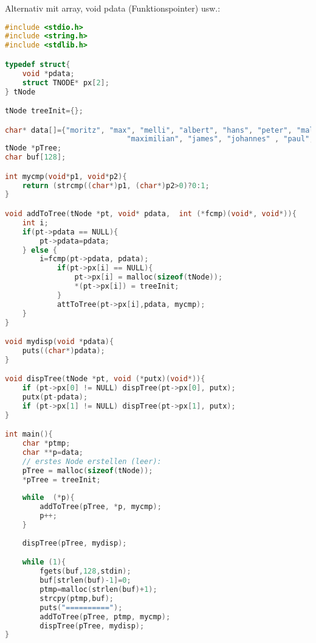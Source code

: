 Alternativ mit array, void pdata (Funktionspointer) usw.:
\begin{lstlisting}[language=C]
#include <stdio.h>
#include <string.h>
#include <stdlib.h>

typedef struct{
	void *pdata;
	struct TNODE* px[2];
} tNode

tNode treeInit={};

char* data[]={"moritz", "max", "melli", "albert", "hans", "peter", "malte",
							"maximilian", "james", "johannes" , "paul",  NULL);
tNode *pTree;
char buf[128];

int mycmp(void*p1, void*p2){
	return (strcmp((char*)p1, (char*)p2>0)?0:1;
}

void addToTree(tNode *pt, void* pdata,  int (*fcmp)(void*, void*)){
	int i;
	if(pt->pdata == NULL){
		pt->pdata=pdata;
	} else {
		i=fcmp(pt->pdata, pdata);
			if(pt->px[i] == NULL){
				pt->px[i] = malloc(sizeof(tNode));
				*(pt->px[i]) = treeInit;
			}
			attToTree(pt->px[i],pdata, mycmp);
	}
}

void mydisp(void *pdata){
	puts((char*)pdata);
}

void dispTree(tNode *pt, void (*putx)(void*)){
	if (pt->px[0] != NULL) dispTree(pt->px[0], putx);
	putx(pt-pdata);
	if (pt->px[1] != NULL) dispTree(pt->px[1], putx);
}

int main(){
	char *ptmp;
	char **p=data;
	// erstes Node erstellen (leer):
	pTree = malloc(sizeof(tNode));
	*pTree = treeInit;
	
	while  (*p){
		addToTree(pTree, *p, mycmp); 
		p++;
	}
	
	dispTree(pTree, mydisp);

	while (1){
		fgets(buf,128,stdin);
		buf[strlen(buf)-1]=0;
		ptmp=malloc(strlen(buf)+1);
		strcpy(ptmp,buf);
		puts("==========");
		addToTree(pTree, ptmp, mycmp);
		dispTree(pTree, mydisp);
}
\end{lstlisting}

\newpage
